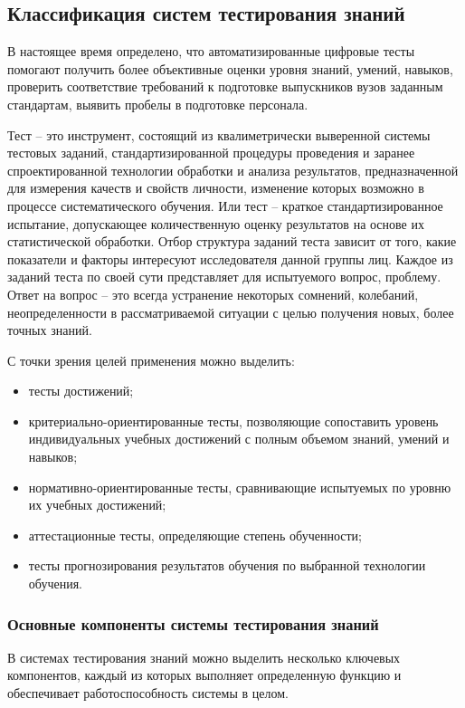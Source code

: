 \subsection{Классификация систем тестирования знаний}

В настоящее время определено, что автоматизированные цифровые тесты помогают
получить более объективные оценки уровня знаний, умений, навыков,
проверить соответствие требований к подготовке выпускников вузов заданным
стандартам, выявить пробелы в подготовке персонала.

Тест – это инструмент, состоящий из квалиметрически выверенной системы тестовых заданий, стандартизированной процедуры проведения и заранее спроектированной технологии обработки и анализа результатов, предназначенной для измерения качеств и свойств личности, изменение которых возможно в процессе систематического обучения. Или тест – краткое стандартизированное испытание, допускающее количественную оценку результатов на основе их
статистической обработки. Отбор структура заданий теста зависит от того, какие показатели и факторы интересуют исследователя данной группы лиц. Каждое из заданий теста по своей сути представляет для испытуемого вопрос, проблему. Ответ на вопрос – это всегда устранение некоторых сомнений, колебаний, неопределенности в рассматриваемой ситуации с целью получения новых, более точных знаний.

С точки зрения целей применения можно выделить:
\begin{itemize}
	\item тесты достижений;
	\item критериально-ориентированные тесты, позволяющие сопоставить
	уровень индивидуальных учебных достижений с полным объемом знаний,
	умений и навыков;
	\item нормативно-ориентированные тесты, сравнивающие испытуемых по
	уровню их учебных достижений;
	\item аттестационные тесты, определяющие степень обученности;
	\item тесты прогнозирования результатов обучения по выбранной
	технологии обучения.
\end{itemize}

\subsubsection{Основные компоненты системы тестирования знаний}

В системах тестирования знаний можно выделить несколько ключевых компонентов, каждый из которых выполняет определенную функцию и обеспечивает работоспособность системы в целом.

